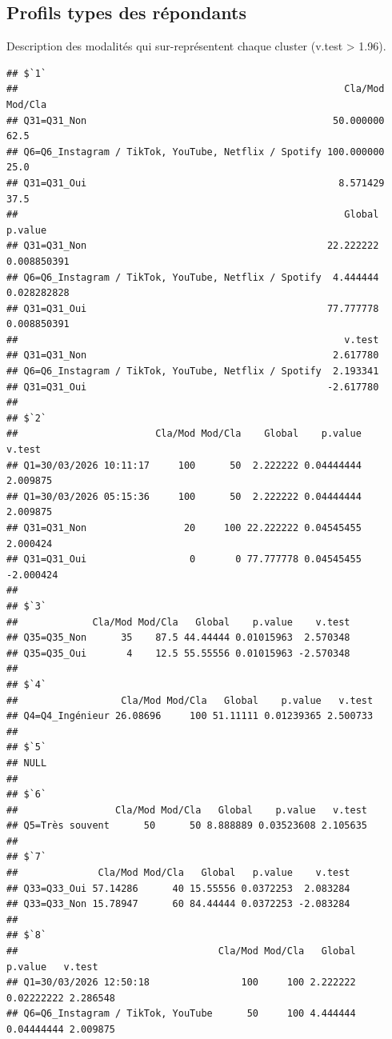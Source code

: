 \documentclass[
]{article}
\newenvironment{Shaded}{\begin{snugshade}}{\end{snugshade}}
\newcommand{\CommentTok}[1]{\textcolor[rgb]{0.56,0.35,0.01}{\textit{#1}}}
\newcommand{\NormalTok}[1]{#1}
\newcommand{\SpecialCharTok}[1]{\textcolor[rgb]{0.00,0.00,0.00}{#1}}
\begin{document}
\hypertarget{profils-types-des-ruxe9pondants}{%
\subsection{Profils types des
répondants}\label{profils-types-des-ruxe9pondants}}

Description des modalités qui sur-représentent chaque cluster (v.test
\textgreater{} 1.96).

\begin{Shaded}
\end{Shaded}

\begin{verbatim}
## $`1`
##                                                         Cla/Mod Mod/Cla
## Q31=Q31_Non                                           50.000000    62.5
## Q6=Q6_Instagram / TikTok, YouTube, Netflix / Spotify 100.000000    25.0
## Q31=Q31_Oui                                            8.571429    37.5
##                                                         Global     p.value
## Q31=Q31_Non                                          22.222222 0.008850391
## Q6=Q6_Instagram / TikTok, YouTube, Netflix / Spotify  4.444444 0.028282828
## Q31=Q31_Oui                                          77.777778 0.008850391
##                                                         v.test
## Q31=Q31_Non                                           2.617780
## Q6=Q6_Instagram / TikTok, YouTube, Netflix / Spotify  2.193341
## Q31=Q31_Oui                                          -2.617780
## 
## $`2`
##                        Cla/Mod Mod/Cla    Global    p.value    v.test
## Q1=30/03/2026 10:11:17     100      50  2.222222 0.04444444  2.009875
## Q1=30/03/2026 05:15:36     100      50  2.222222 0.04444444  2.009875
## Q31=Q31_Non                 20     100 22.222222 0.04545455  2.000424
## Q31=Q31_Oui                  0       0 77.777778 0.04545455 -2.000424
## 
## $`3`
##             Cla/Mod Mod/Cla   Global    p.value    v.test
## Q35=Q35_Non      35    87.5 44.44444 0.01015963  2.570348
## Q35=Q35_Oui       4    12.5 55.55556 0.01015963 -2.570348
## 
## $`4`
##                  Cla/Mod Mod/Cla   Global    p.value   v.test
## Q4=Q4_Ingénieur 26.08696     100 51.11111 0.01239365 2.500733
## 
## $`5`
## NULL
## 
## $`6`
##                 Cla/Mod Mod/Cla   Global    p.value   v.test
## Q5=Très souvent      50      50 8.888889 0.03523608 2.105635
## 
## $`7`
##              Cla/Mod Mod/Cla   Global   p.value    v.test
## Q33=Q33_Oui 57.14286      40 15.55556 0.0372253  2.083284
## Q33=Q33_Non 15.78947      60 84.44444 0.0372253 -2.083284
## 
## $`8`
##                                   Cla/Mod Mod/Cla   Global    p.value   v.test
## Q1=30/03/2026 12:50:18                100     100 2.222222 0.02222222 2.286548
## Q6=Q6_Instagram / TikTok, YouTube      50     100 4.444444 0.04444444 2.009875
\end{verbatim}
\end{document}
